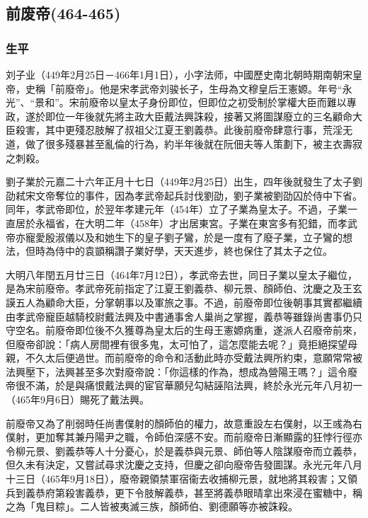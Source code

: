 
\subsection{前废帝\tiny(464-465)}

\subsubsection{生平}

刘子业（449年2月25日－466年1月1日），小字法师，中國歷史南北朝時期南朝宋皇帝，史稱「前廢帝」。他是宋孝武帝刘骏长子，生母為文穆皇后王憲嫄。年号“永光”、“景和”。宋前廢帝以皇太子身份即位，但即位之初受制於掌權大臣而難以專政，遂於即位一年後就先將主政大臣戴法興誅殺，接著又將圖謀廢立的三名顧命大臣殺害，其中更殘忍肢解了叔祖父江夏王劉義恭。此後前廢帝肆意行事，荒淫无道，做了很多殘暴甚至亂倫的行為，約半年後就在阮佃夫等人策劃下，被主衣壽寂之刺殺。

劉子業於元嘉二十六年正月十七日（449年2月25日）出生，四年後就發生了太子劉劭弒宋文帝奪位的事件，因為孝武帝起兵討伐劉劭，劉子業被劉劭囚於侍中下省。同年，孝武帝即位，於翌年孝建元年（454年）立了子業為皇太子。不過，子業一直居於永福省，在大明二年（458年）才出居東宮。子業在東宮多有犯錯，而孝武帝亦寵愛殷淑儀以及和她生下的皇子劉子鸞，於是一度有了廢子業，立子鸞的想法，但時為侍中的袁顗稱讚子業好學，天天進步，終也保住了其太子之位。

大明八年閏五月廿三日（464年7月12日），孝武帝去世，同日子業以皇太子繼位，是為宋前廢帝。孝武帝死前指定了江夏王劉義恭、柳元景、顏師伯、沈慶之及王玄謨五人為顧命大臣，分掌朝事以及軍旅之事。不過，前廢帝即位後朝事其實都繼續由孝武帝寵臣越騎校尉戴法興及中書通事舍人巢尚之掌握，義恭等雖錄尚書事仍只守空名。前廢帝即位後不久獲尊為皇太后的生母王憲嫄病重，遂派人召廢帝前來，但廢帝卻說：「病人房間裡有很多鬼，太可怕了，這怎麼能去呢？」竟拒絕探望母親，不久太后便過世。而前廢帝的命令和活動此時亦受戴法興所約束，意願常常被法興壓下，法興甚至多次對廢帝說：「你這樣的作為，想成為營陽王嗎？」這令廢帝很不滿，於是與痛恨戴法興的宦官華願兒勾結誣陷法興，終於永光元年八月初一（465年9月6日）賜死了戴法興。

前廢帝又為了削弱時任尚書僕射的顏師伯的權力，故意重設左右僕射，以王彧為右僕射，更加奪其兼丹陽尹之職，令師伯深感不安。而前廢帝日漸顯露的狂悖行徑亦令柳元景、劉義恭等人十分憂心，於是義恭與元景、師伯等人陰謀廢帝而立義恭，但久未有決定，又嘗試尋求沈慶之支持，但慶之卻向廢帝告發圖謀。永光元年八月十三日（465年9月18日），廢帝親領禁軍宿衞去收捕柳元景，就地將其殺害；又領兵到義恭府第殺害義恭，更下令肢解義恭，甚至將義恭眼晴拿出來浸在蜜糖中，稱之為「鬼目粽」。二人皆被夷滅三族，顏師伯、劉德願等亦被誅殺。


